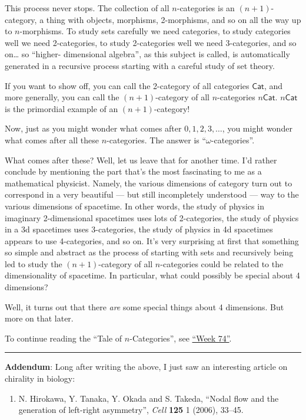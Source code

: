 \documentclass{article}
\def\tightlist{}
\begin{document}
This process never stops. The collection of all \(n\)-categories is an
\((n+1)\)-category, a thing with objects, morphisms, 2-morphisms, and so
on all the way up to \(n\)-morphisms. To study sets carefully we need
categories, to study categories well we need 2-categories, to study
2-categories well we need 3-categories, and so on\ldots{} so ``higher-
dimensional algebra'', as this subject is called, is automatically
generated in a recursive process starting with a careful study of set
theory.

If you want to show off, you can call the 2-category of all categories
\(\mathsf{Cat}\), and more generally, you can call the
\((n+1)\)-category of all \(n\)-categories \(n\mathsf{Cat}\).
\(n\mathsf{Cat}\) is the primordial example of an \((n+1)\)-category!

Now, just as you might wonder what comes after \(0,1,2,3,\ldots\), you
might wonder what comes after all these \(n\)-categories. The answer is
``\(\omega\)-categories''.

What comes after these? Well, let us leave that for another time. I'd
rather conclude by mentioning the part that's the most fascinating to me
as a mathematical physicist. Namely, the various dimensions of category
turn out to correspond in a very beautiful --- but still incompletely
understood --- way to the various dimensions of spacetime. In other
words, the study of physics in imaginary 2-dimensional spacetimes uses
lots of 2-categories, the study of physics in a 3d spacetimes uses
3-categories, the study of physics in 4d spacetimes appears to use
4-categories, and so on. It's very surprising at first that something so
simple and abstract as the process of starting with sets and recursively
being led to study the \((n+1)\)-category of all \(n\)-categories could
be related to the dimensionality of spacetime. In particular, what could
possibly be special about 4 dimensions?

Well, it turns out that there \emph{are} some special things about 4
dimensions. But more on that later.

To continue reading the ``Tale of \(n\)-Categories'', see
\protect\hyperlink{week74}{``Week 74''}.

\begin{center}\rule{0.5\linewidth}{0.5pt}\end{center}

\textbf{Addendum}: Long after writing the above, I just saw an
interesting article on chirality in biology:

\begin{enumerate}
\def\labelenumi{\arabic{enumi})}
\setcounter{enumi}{1}
\tightlist
\item
  N. Hirokawa, Y. Tanaka, Y. Okada and S. Takeda, ``Nodal flow and the
  generation of left-right asymmetry'', \emph{Cell} \textbf{125} 1
  (2006), 33--45.
\end{enumerate}
\end{document}
